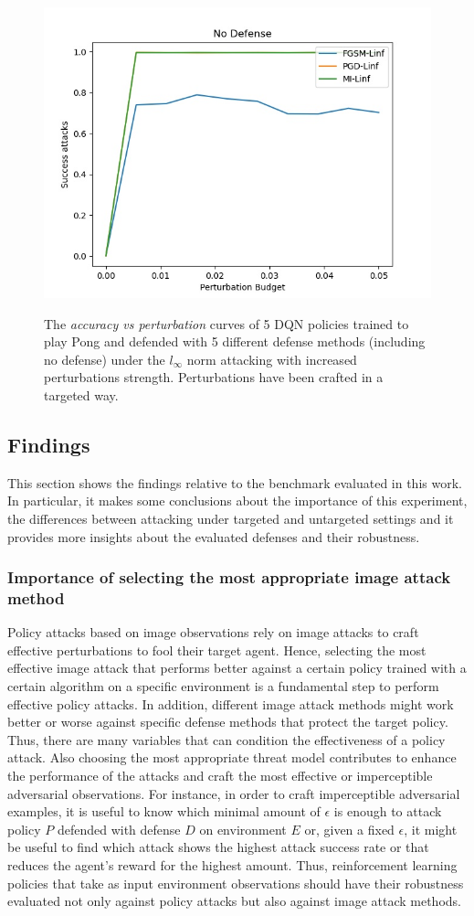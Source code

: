\begin{figure}
    {\includegraphics[width=0.49\linewidth]{images/exp3/targeted/No_Defense_succ.jpg}}
  \caption{The {\it accuracy vs perturbation} curves of 5 DQN policies trained to play Pong and defended with 5 different defense methods (including no defense) under the \(l_\infty\) norm attacking with increased perturbations strength. Perturbations have been crafted in a targeted way.}
  \label{figure:targeted-suc}
\end{figure}

\subsection{Findings}
This section shows the findings relative to the benchmark evaluated in this work. In particular, it makes some conclusions about the importance of this experiment, the differences between attacking under targeted and untargeted settings and it provides more insights about the evaluated defenses and their robustness.

\subsubsection{Importance of selecting the most appropriate image attack method}
Policy attacks based on image observations rely on image attacks to craft effective perturbations to fool their target agent. Hence, selecting the most effective image attack that performs better against a certain policy trained with a certain algorithm on a specific environment is a fundamental step to perform effective policy attacks.  In addition, different image attack methods might work better or worse against specific defense methods that protect the target policy. Thus, there are many variables that can condition the effectiveness of a policy attack. Also choosing the most appropriate threat model contributes to enhance the performance of the attacks and craft the most effective or imperceptible adversarial observations. For instance, in order to craft imperceptible adversarial examples, it is useful to know which minimal amount of \(\epsilon\) is enough to attack policy \(P\) defended with defense \(D\) on environment \(E\) or, given a fixed \(\epsilon\), it might be useful to find which attack shows the highest attack success rate or that reduces the agent's reward for the highest amount. Thus, reinforcement learning policies that take as input environment observations should have their robustness evaluated not only against policy attacks but also against image attack methods.

